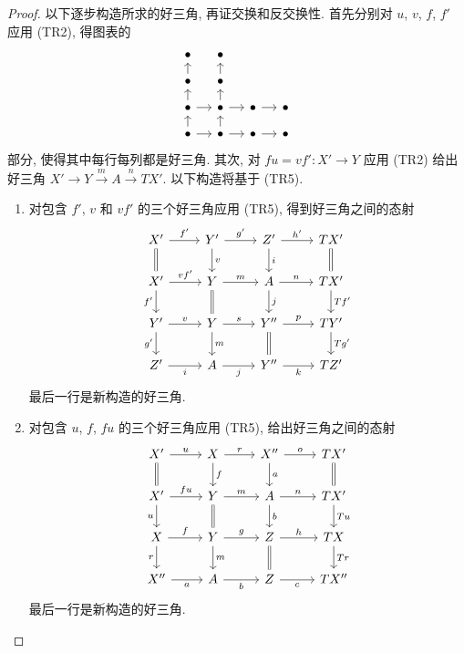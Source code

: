 \begin{proof}
	以下逐步构造所求的好三角, 再证交换和反交换性. 首先分别对 $u$, $v$, $f$, $f'$ 应用 (TR2), 得图表的
	\[\begin{tikzcd}[row sep=small, column sep=small]
		\bullet & \bullet & & \\
		\bullet \arrow[u] & \bullet \arrow[u] & & \\
		\bullet \arrow[r] \arrow[u] & \bullet \arrow[r] \arrow[u] & \bullet \arrow[r] & \bullet \\
		\bullet \arrow[r] \arrow[u] & \bullet \arrow[u] \arrow[r] & \bullet \arrow[r] & \bullet
	\end{tikzcd}\]
	部分, 使得其中每行每列都是好三角. 其次, 对 $fu = vf' : X' \to Y$ 应用 (TR2) 给出好三角 $X' \to Y \xrightarrow{m} A \xrightarrow{n} TX'$. 以下构造将基于 (TR5).
	\begin{enumerate}
		\item 对包含 $f'$, $v$ 和 $vf'$ 的三个好三角应用 (TR5), 得到好三角之间的态射
		\begin{equation}\label{eqn:triangulated-9-diag-aux-0}\begin{tikzcd}
			X' \arrow[r, "{f'}"] \arrow[equal, d] & Y' \arrow[r, "{g'}"] \arrow[d, "v"] & Z' \arrow[r, "{h'}"] \arrow[d, "i"] & TX' \arrow[equal, d] \\
			X' \arrow[r, "{vf'}"] \arrow[d, "{f'}"'] & Y \arrow[r, "m"] \arrow[equal, d] & A \arrow[r, "n"] \arrow[d, "j"] & TX' \arrow[d, "{Tf'}"] \\
			Y' \arrow[r, "v"] \arrow[d, "{g'}"'] & Y \arrow[r, "s"] \arrow[d, "m"] & Y'' \arrow[r, "p"] \arrow[equal, d] & TY' \arrow[d, "{Tg'}"] \\
			Z' \arrow[r, "i"'] & A \arrow[r, "j"'] & Y'' \arrow[r, "k"'] & TZ' 
		\end{tikzcd}\end{equation}
		最后一行是新构造的好三角.

		\item 对包含 $u$, $f$, $fu$ 的三个好三角应用 (TR5), 给出好三角之间的态射
		\begin{equation}\label{eqn:triangulated-9-diag-aux-1}\begin{tikzcd}
			X' \arrow[r, "u"] \arrow[equal, d] & X \arrow[r, "r"] \arrow[d, "f"] & X'' \arrow[r, "o"] \arrow[d, "a"] & TX' \arrow[equal, d] \\
			X' \arrow[r, "fu"] \arrow[d, "u"'] & Y \arrow[r, "m"] \arrow[equal, d] & A \arrow[r, "n"] \arrow[d, "b"] & TX' \arrow[d, "Tu"] \\
			X \arrow[r, "f"] \arrow[d, "r"'] & Y \arrow[r, "g"] \arrow[d, "m"] & Z \arrow[r, "h"] \arrow[equal, d] & TX \arrow[d, "Tr"] \\
			X'' \arrow[r, "a"'] & A \arrow[r, "b"'] & Z \arrow[r, "c"'] & TX''
		\end{tikzcd}\end{equation}
		最后一行是新构造的好三角.


\end{enumerate}
\end{proof}
